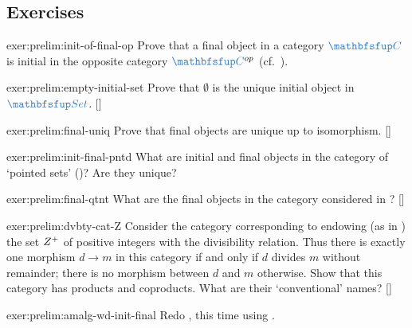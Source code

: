 \subsection*{Exercises}

\begin{exer}{}{exer:prelim:init-of-final-op}
  Prove that a final object in a category $\categ{C}$ is initial in
  the opposite category $\categ{C}^{op}$ (cf.\
  ).
\end{exer}

\begin{exer}{\exerused}{exer:prelim:empty-initial-set}
  Prove that $\emptyset$ is the unique initial object in
  $\categ{Set}$. []
\end{exer}

\begin{exer}{\exerused}{exer:prelim:final-uniq}
  Prove that final objects are unique up to
  isomorphism. []
\end{exer}

\begin{exer}{}{exer:prelim:init-final-pntd}
  What are initial and final objects in the category of `pointed sets'
  (\Cref{exam:prelims:pointed-sets})? Are they unique?
\end{exer}

\begin{exer}{\exerused}{exer:prelim:final-qtnt}
  What are the final objects in the category considered in
  ?
  [\Cref{subsec:prelims:quotients}]
\end{exer}

\begin{exer}{\exerused}{exer:prelim:dvbty-cat-Z}
  Consider the category corresponding to endowing (as in
  ) the set $Z^+$ of positive
  integers with the divisibility relation. Thus there is exactly one
  morphism $d \to m$ in this category if and only if $d$ divides $m$
  without remainder; there is no morphism between $d$ and $m$
  otherwise. Show that this category has products and coproducts. What
  are their `conventional' names?
  []
\end{exer}

\begin{exer}{}{exer:prelim:amalg-wd-init-final}
  Redo , this time using
  .
\end{exer}

